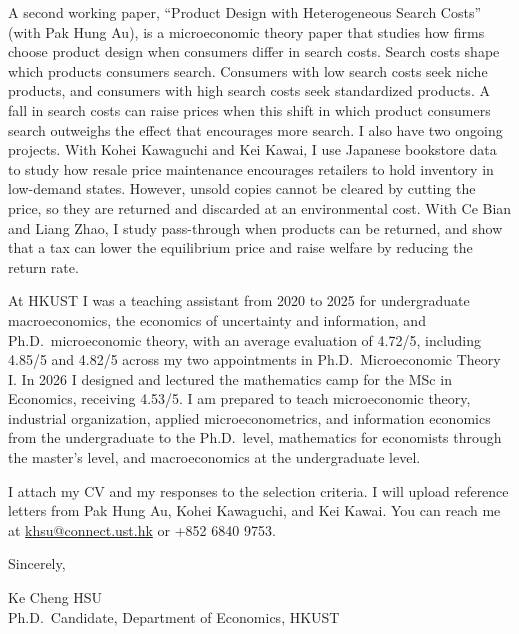 \documentclass[11pt]{article}
\begin{document}
A second working paper, ``Product Design with Heterogeneous Search Costs'' (with Pak Hung Au), is a microeconomic theory paper that studies how firms choose product design when consumers differ in search costs. Search costs shape which products consumers search. Consumers with low search costs seek niche products, and consumers with high search costs seek standardized products. A fall in search costs can raise prices when this shift in which product consumers search outweighs the effect that encourages more search. I also have two ongoing projects. With Kohei Kawaguchi and Kei Kawai, I use Japanese bookstore data to study how resale price maintenance encourages retailers to hold inventory in low-demand states. However, unsold copies cannot be cleared by cutting the price, so they are returned and discarded at an environmental cost. With Ce Bian and Liang Zhao, I study pass-through when products can be returned, and show that a tax can lower the equilibrium price and raise welfare by reducing the return rate.

At HKUST I was a teaching assistant from 2020 to 2025 for undergraduate macroeconomics, the economics of uncertainty and information, and Ph.D.\ microeconomic theory, with an average evaluation of 4.72/5, including 4.85/5 and 4.82/5 across my two appointments in Ph.D.\ Microeconomic Theory I. In 2026 I designed and lectured the mathematics camp for the MSc in Economics, receiving 4.53/5. I am prepared to teach microeconomic theory, industrial organization, applied microeconometrics, and information economics from the undergraduate to the Ph.D.\ level, mathematics for economists through the master's level, and macroeconomics at the undergraduate level.

I attach my CV and my responses to the selection criteria. I will upload reference letters from Pak Hung Au, Kohei Kawaguchi, and Kei Kawai. You can reach me at \href{mailto:khsu@connect.ust.hk}{khsu@connect.ust.hk} or +852 6840 9753.

\vspace{0.25em}
Sincerely,

\vspace{0.25em}
Ke Cheng HSU \\
Ph.D.\ Candidate, Department of Economics, HKUST
\end{document}
